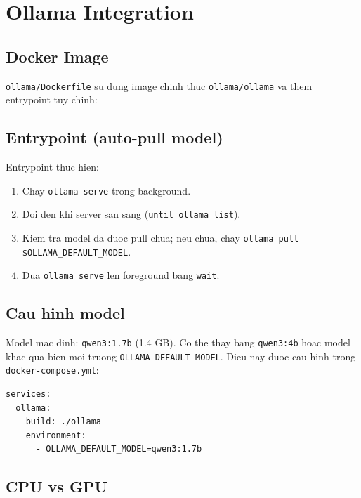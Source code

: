 \documentclass[12pt,a4paper]{article}
\begin{document}
\section{Ollama Integration}

\subsection{Docker Image}

\texttt{ollama/Dockerfile} su dung image chinh thuc \texttt{ollama/ollama} va
them entrypoint tuy chinh:



\subsection{Entrypoint (auto-pull model)}



Entrypoint thuc hien:
\begin{enumerate}
  \item Chay \texttt{ollama serve} trong background.
  \item Doi den khi server san sang (\texttt{until ollama list}).
  \item Kiem tra model da duoc pull chua; neu chua, chay
        \texttt{ollama pull \$OLLAMA\_DEFAULT\_MODEL}.
  \item Dua \texttt{ollama serve} len foreground bang \texttt{wait}.
\end{enumerate}

\subsection{Cau hinh model}

Model mac dinh: \texttt{qwen3:1.7b} (1.4 GB). Co the thay bang
\texttt{qwen3:4b} hoac model khac qua bien moi truong
\texttt{OLLAMA\_DEFAULT\_MODEL}. Dieu nay duoc cau hinh trong
\texttt{docker-compose.yml}:

\begin{lstlisting}[style=bash, language={}]
services:
  ollama:
    build: ./ollama
    environment:
      - OLLAMA_DEFAULT_MODEL=qwen3:1.7b
\end{lstlisting}

\subsection{CPU vs GPU}
\end{document}
